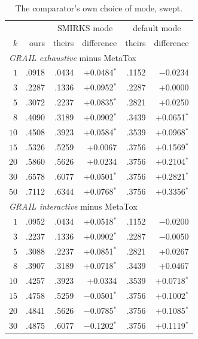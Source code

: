 \begin{table}[h]
\centering\scriptsize
\begin{threeparttable}
\caption{The comparator's own choice of mode, swept.}
\label{tab:si-metatox-mode}
\setlength{\tabcolsep}{4pt}
\begin{tabular}{rrrrrr}
\toprule
 & & \multicolumn{2}{c}{SMIRKS mode} & \multicolumn{2}{c}{default mode} \\
$k$ & ours & theirs & difference & theirs & difference \\
\midrule
\multicolumn{6}{l}{\emph{GRAIL exhaustive} minus MetaTox} \\
$1$ & .0918 & .0434 & +0.0484$^{*}$ & .1152 & $-$0.0234\phantom{$^{*}$} \\
$3$ & .2287 & .1336 & +0.0952$^{*}$ & .2287 & +0.0000\phantom{$^{*}$} \\
$5$ & .3072 & .2237 & +0.0835$^{*}$ & .2821 & +0.0250\phantom{$^{*}$} \\
$8$ & .4090 & .3189 & +0.0902$^{*}$ & .3439 & +0.0651$^{*}$ \\
$10$ & .4508 & .3923 & +0.0584$^{*}$ & .3539 & +0.0968$^{*}$ \\
$15$ & .5326 & .5259 & +0.0067\phantom{$^{*}$} & .3756 & +0.1569$^{*}$ \\
$20$ & .5860 & .5626 & +0.0234\phantom{$^{*}$} & .3756 & +0.2104$^{*}$ \\
$30$ & .6578 & .6077 & +0.0501$^{*}$ & .3756 & +0.2821$^{*}$ \\
$50$ & .7112 & .6344 & +0.0768$^{*}$ & .3756 & +0.3356$^{*}$ \\
\multicolumn{6}{l}{\emph{GRAIL interactive} minus MetaTox} \\
$1$ & .0952 & .0434 & +0.0518$^{*}$ & .1152 & $-$0.0200\phantom{$^{*}$} \\
$3$ & .2237 & .1336 & +0.0902$^{*}$ & .2287 & $-$0.0050\phantom{$^{*}$} \\
$5$ & .3088 & .2237 & +0.0851$^{*}$ & .2821 & +0.0267\phantom{$^{*}$} \\
$8$ & .3907 & .3189 & +0.0718$^{*}$ & .3439 & +0.0467\phantom{$^{*}$} \\
$10$ & .4257 & .3923 & +0.0334\phantom{$^{*}$} & .3539 & +0.0718$^{*}$ \\
$15$ & .4758 & .5259 & $-$0.0501$^{*}$ & .3756 & +0.1002$^{*}$ \\
$20$ & .4841 & .5626 & $-$0.0785$^{*}$ & .3756 & +0.1085$^{*}$ \\
$30$ & .4875 & .6077 & $-$0.1202$^{*}$ & .3756 & +0.1119$^{*}$ \\

\end{tabular}
\end{threeparttable}
\end{table}
